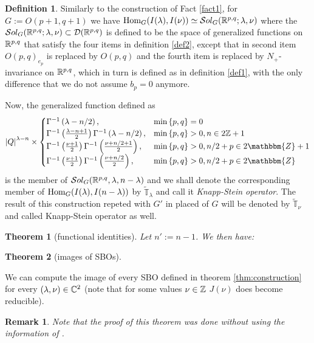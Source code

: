 \documentclass[10pt]{article} %
\newtheorem{theorem}{Theorem}
\newcommand{\Hom}{\mbox{\normalfont Hom}}
\newcommand{\Sol}{\mathcal{S}ol}
\newtheorem{remark}{Remark}
\theoremstyle{definition}
\newtheorem{definition}{Definition}
\begin{document}
	\begin{definition}
		Similarly to the construction of Fact \ref{fact1}, for $G:=O(p+1,q+1)$ we have $\Hom_G(I(\lambda),I(\nu))\simeq\Sol_G(\R^{p,q};\lambda,\nu)$
		where the $\Sol_G(\R^{p,q};\lambda,\nu)\subset\mathcal{D}(\R^{p,q})$ is defined to be the space of generalized functions on $\mathbb{R}^{p,q}$ that satisfy
		the four items in definition \ref{def2}, except that in second item $O(p,q)_{e_p}$ is replaced by $O(p,q)$ and the fourth item is replaced by $N_+$-invariance
		on $\mathbb{R}^{p,q}$, which in turn is defined as in definition \ref{def1}, with the only difference that we do not assume $b_p=0$ anymore.

		Now, the generalized function defined as
		\begin{equation*}
			\myabs{Q}^{\lambda-n}\times\begin{cases}
				\Gamma^{-1}\left( \lambda-n/2 \right),&\min\left\{ p,q \right\}=0\\
				\Gamma^{-1}\left( \frac{\lambda-n+1}{2} \right)\Gamma^{-1}\left( \lambda-n/2 \right),&\min\left\{ p,q \right\}>0,n\in2\Z+1\\
  \Gamma^{-1} \left( \frac{\nu + 1}{2} \right) \Gamma ^{-1}\left( \frac{\nu + n / 2 +
  1}{2} \right), &\min\left\{ p,q \right\}>0, n / 2 + p \in 2\mathbbm{Z}+ 1\\
  \Gamma^{-1} \left( \frac{\nu + 1}{2} \right) \Gamma ^{-1}\left( \frac{\nu + n / 2}{2}
  \right), & \min\left\{ p,q \right\}>0,n / 2 + p \in 2\mathbbm{Z}
			\end{cases}
		\end{equation*}
		is the member of $\Sol_G(\R^{p,q},\lambda,n-\lambda)$ and we shall denote the corresponding member of $\Hom_{G}(I(\lambda),I(n-\lambda))$ by $\tilde{\mathbb{T}}_{\lambda}$
		and call it \textit{Knapp-Stein operator}.
		The result of this construction repeted with $G'$ in placed of $G$ will be denoted by $\tilde{\mathbb{T}}_\nu$ and called Knapp-Stein operator as well.
	\end{definition}
	\begin{theorem}[functional identities]
		Let $n':=n-1$. We then have:
	\end{theorem}
\begin{theorem}[images of SBOs]
\end{theorem}
We can compute the image of every SBO defined in theorem \ref{thm:construction} for every $(\lambda,\nu)\in\mathbb{C}^2$ (note that for some values $\nu\in\mathbb{Z}$ $J(\nu)$ does become reducible).
\begin{remark}
	Note that the proof of this theorem was done \textit{without} using the information of \cite{howe1993homogeneous}.
\end{remark}
\end{document}
